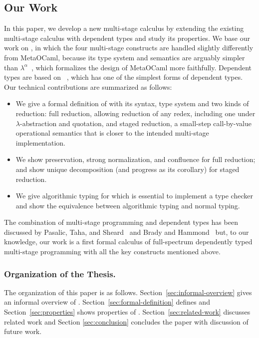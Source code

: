 \subsection{Our Work}
In this paper, we develop a new multi-stage calculus \LMD by extending
the existing multi-stage calculus \LTP\cite{Hanada2014} with dependent
types and study its properties.  We base our work on \LTP, in which
the four multi-stage constructs are handled slightly differently from
MetaOCaml, because its type system and semantics are arguably simpler
than \(\lambda^\alpha\)~\cite{taha2003environment}, which formalizes
the design of MetaOCaml more faithfully.  Dependent types are based on
\LLF~\cite{attapl}, which has one of the simplest forms of dependent
types.  Our technical contributions are summarized as follows:
\begin{itemize}
    \item We give a formal definition of \LMD with its syntax, type system and
        two kinds of reduction: full reduction, allowing reduction of any redex,
        including one under $\lambda$-abstraction and quotation, and staged reduction, a
        small-step call-by-value operational semantics that is closer to the intended
        multi-stage implementation.
    \item We show preservation, strong normalization, and confluence for
        full reduction; and show unique decomposition (and progress as its
        corollary) for staged reduction.
    \item We give algorithmic typing for \LMD which is essential to implement a
        type checker and show the equivalence between algorithmic typing and
        normal typing.
\end{itemize}
The combination of multi-stage programming and dependent types has been
discussed by Pasalic, Taha, and Sheard~\cite{pasalic2002tagless} and Brady and
Hammond~\cite{brady2006dependently} but, to our knowledge, our work is a first
formal calculus of full-spectrum dependently typed multi-stage programming with
all the key constructs mentioned above.

\subsubsection{Organization of the Thesis.}

The organization of this paper is as follows.
Section~\ref{sec:informal-overview} gives an informal overview of
\LMD. Section~\ref{sec:formal-definition} defines \LMD and
Section~\ref{sec:properties} shows properties of \LMD.
Section~\ref{sec:related-work} discusses related work and Section
\ref{sec:conclusion} concludes the paper with discussion of future
work.
